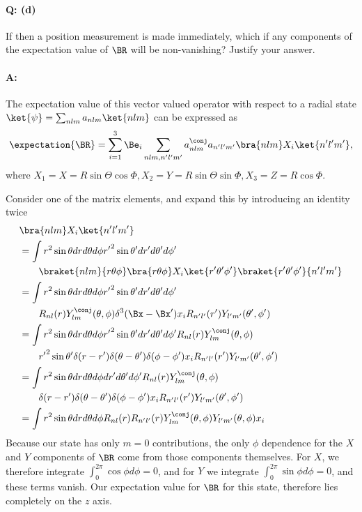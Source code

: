 {\paragraph{Q: (d)}
%
If then a position measurement is made immediately, which if any components of the expectation value of \(\BR\) will be non-vanishing?  Justify your answer.
%
\paragraph{A:}
%
The expectation value of this vector valued operator with respect to a radial state \(\ket{\psi} = \sum_{nlm} a_{nlm} \ket{nlm}\) can be expressed as
%
\begin{equation}\label{eqn:qmIexamPractice2007Dec:4:400}
\expectation{\BR} = \sum_{i=1}^3 \Be_i \sum_{nlm, n'l'm'}
a_{nlm}^\conj a_{n'l'm'}
\bra{nlm} X_i
\ket{n'l'm'},
\end{equation}
%
where \(X_1 = X = R \sin\Theta \cos\Phi, X_2 = Y = R \sin\Theta \sin\Phi, X_3 = Z = R \cos\Phi\).

Consider one of the matrix elements, and expand this by introducing an identity twice
\begin{equation}\label{eqn:qmIexamPractice2007Dec:550}
\begin{aligned}
&\bra{nlm} X_i \ket{n'l'm'} \\
&=
\int
r^2 \sin\theta dr d\theta d\phi
{r'}^2 \sin\theta' dr' d\theta' d\phi' \\
&\qquad
\braket{nlm}{r \theta \phi} \bra{r \theta \phi} X_i \ket{r' \theta' \phi' }\braket{r' \theta' \phi'}{n'l'm'} \\
&=
\int
r^2 \sin\theta dr d\theta d\phi
{r'}^2 \sin\theta' dr' d\theta' d\phi' \\
&\qquad
R_{nl}(r) Y_{lm}^\conj(\theta,\phi)
\delta^3(\Bx - \Bx') x_i
R_{n'l'}(r') Y_{l'm'}(\theta',\phi')
\\
&=
\int
r^2 \sin\theta dr d\theta d\phi
{r'}^2 \sin\theta' dr' d\theta' d\phi'
R_{nl}(r) Y_{lm}^\conj(\theta,\phi) \\
&\qquad{r'}^2 \sin\theta' \delta(r-r') \delta(\theta - \theta') \delta(\phi-\phi')
x_i
R_{n'l'}(r') Y_{l'm'}(\theta',\phi')
\\
&=
\int
r^2 \sin\theta dr d\theta d\phi
dr' d\theta' d\phi' 
R_{nl}(r) Y_{lm}^\conj(\theta,\phi) \\
&\qquad
\delta(r-r') \delta(\theta - \theta') \delta(\phi-\phi')
x_i
R_{n'l'}(r') Y_{l'm'}(\theta',\phi')
\\
&=
\int
r^2 \sin\theta dr d\theta d\phi
R_{nl}(r) R_{n'l'}(r)
Y_{lm}^\conj(\theta,\phi) Y_{l'm'}(\theta,\phi)
x_i
\\
\end{aligned}
\end{equation}
%
Because our state has only \(m=0\) contributions, the only \(\phi\) dependence for the \(X\) and \(Y\) components of \(\BR\) come from those components themselves.  For \(X\), we therefore integrate \(\int_0^{2\pi} \cos\phi d\phi = 0\), and for \(Y\) we integrate \(\int_0^{2\pi} \sin\phi d\phi = 0\), and these terms vanish.  Our expectation value for \(\BR\) for this state, therefore lies completely on the \(z\) axis.
} %
